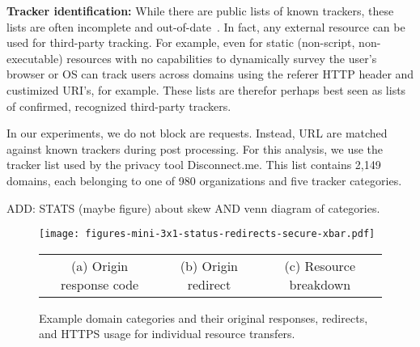 \documentclass{sig-alternate-10pt}
\begin{document}
{\bf Tracker identification:}
While there are public lists of known trackers, 
these lists are often incomplete and out-of-date~\cite{ref35, ref22}.
In fact,  any external resource can be used for third-party tracking.
For example, even for static (non-script, non-executable) resources with no capabilities to
dynamically survey the user’s browser or OS can track users across domains using
the referer  HTTP header and custimized URI's, for example.
These lists are therefor perhaps best seen as lists of confirmed, recognized third-party trackers.

In our experiments, we do not block are requests.  Instead, URL are matched against known 
trackers during post processing.  For this analysis, we use the tracker list
used by the privacy tool Disconnect.me.  This list contains 2,149 domains,
each belonging to one of 980 organizations and five tracker categories.

ADD: STATS (maybe figure) about skew AND venn diagram of categories.


\begin{figure*}[t]
\centering
\texttt{[image: figures-mini-3x1-status-redirects-secure-xbar.pdf]}
\begin{tabular}{ccc}
(a) Origin response code &
(b) Origin redirect &
(c) Resource breakdown \\
\end{tabular}
\caption{Example domain categories and their original responses, 
redirects, and HTTPS usage for individual resource transfers.}
\label{fig:httpsDiff}
\vspace{-0pt}
\end{figure*}
\end{document}
